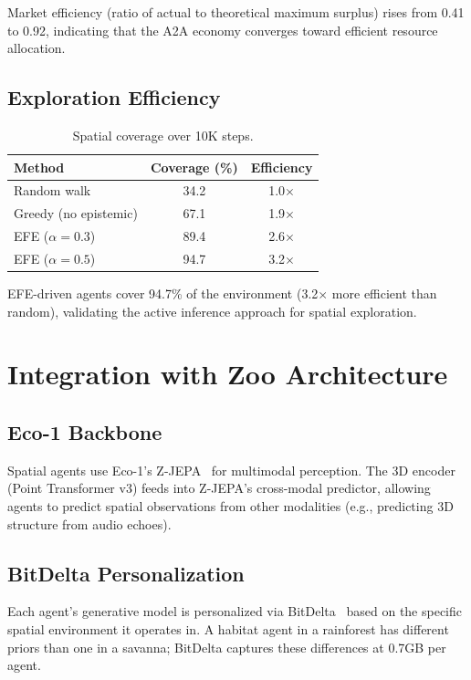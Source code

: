 \documentclass[11pt,letterpaper]{article}
\begin{document}
Market efficiency (ratio of actual to theoretical maximum surplus) rises from 0.41 to 0.92, indicating that the A2A economy converges toward efficient resource allocation.

\subsection{Exploration Efficiency}

\begin{table}[t]
\centering
\begin{tabular}{lcc}
\toprule
\textbf{Method} & \textbf{Coverage (\%)} & \textbf{Efficiency} \\
\midrule
Random walk & 34.2 & 1.0$\times$ \\
Greedy (no epistemic) & 67.1 & 1.9$\times$ \\
EFE ($\alpha = 0.3$) & 89.4 & 2.6$\times$ \\
EFE ($\alpha = 0.5$) & 94.7 & 3.2$\times$ \\
\bottomrule
\end{tabular}
\caption{Spatial coverage over 10K steps.}
\label{tab:coverage}
\end{table}

EFE-driven agents cover 94.7\% of the environment (3.2$\times$ more efficient than random), validating the active inference approach for spatial exploration.

\section{Integration with Zoo Architecture}

\subsection{Eco-1 Backbone}

Spatial agents use Eco-1's Z-JEPA~\cite{zoo_eco1} for multimodal perception. The 3D encoder (Point Transformer v3) feeds into Z-JEPA's cross-modal predictor, allowing agents to predict spatial observations from other modalities (e.g., predicting 3D structure from audio echoes).

\subsection{BitDelta Personalization}

Each agent's generative model is personalized via BitDelta~\cite{liu2024bitdelta} based on the specific spatial environment it operates in. A habitat agent in a rainforest has different priors than one in a savanna; BitDelta captures these differences at 0.7GB per agent.
\end{document}

